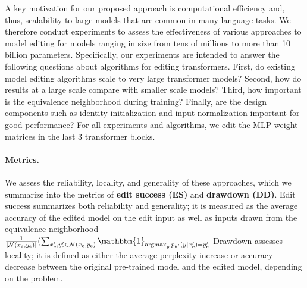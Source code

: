 \documentclass{article}
\begin{document}
A key motivation for our proposed approach is computational efficiency and, thus, scalability to large models that are common in many language tasks.
We therefore conduct experiments to assess the effectiveness of various approaches to model editing for models ranging in size from tens of millions to more than 10 billion parameters. Specifically, our experiments are intended to answer the following questions about algorithms for editing transformers.
First, do existing model editing algorithms scale to very large transformer models? Second, how do results at a large scale compare with smaller scale models? Third, how important is the equivalence neighborhood during training?
Finally, are the design components such as identity initialization and input normalization important for good performance? For all experiments and algorithms, we edit the MLP weight matrices in the last 3 transformer blocks.

\paragraph{Metrics.} We assess the reliability, locality, and generality of these approaches,
which we summarize into the metrics of \textbf{edit success (ES)} and \textbf{drawdown (DD)}. Edit success summarizes both reliability and generality; it is measured as the average accuracy of the edited model on the edit input as well as inputs drawn from the equivalence neighborhood $\frac{1}{|\mathcal{N}(\xe,\ye)|}(\sum_{\xe',\ye' \in \mathcal{N}(\xe,\ye)}\mathbbm{1}_{\argmax_yp_{\theta'}(y|\xe') = \ye'}$
Drawdown assesses locality; it is defined as either the average perplexity increase or accuracy decrease between the original pre-trained model and the edited model, depending on the problem.
\end{document}
